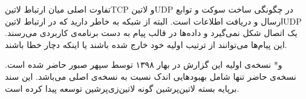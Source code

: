 \documentclass[]{article}
\begin{document}
  تفاوت اصلی میان ارتباط ‌لاتین{TCP} و ‌لاتین{UDP} در چگونگی ساخت سوکت و توابع ارسال و دریافت اطلاعات است.
  البته از شبکه به خاطر دارید که در ارتباط ‌لاتین{UDP} یک اتصال شکل نمی‌گیرد
  و داده‌ها در قالب پیام به دست برنامه‌ی کاربردی می‌رسند.
  این پیام‌ها می‌توانند از ترتیب اولیه خود خارج شده باشند یا اینکه دچار خطا باشند.

  ‌و*{}
  نسخه‌ی اولیه این گزارش در بهار ۱۳۹۸ توسط سپهر صبور حاضر شده است. نسخه‌ی حاضر تنها شامل بهبودهایی اندک نسبت به نسخه‌ی اصلی می‌باشد.
  این سند برپایه بسته ‌لاتین{‌پرشین} گونه ‌لاتین{‌زی‌پرشین} توسعه پیدا کرده است.
\end{document}
